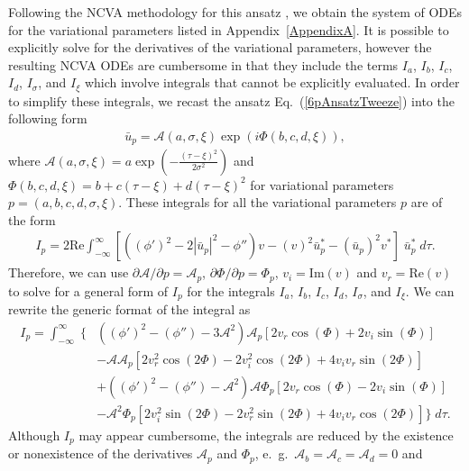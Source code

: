 Following the NCVA methodology for this ansatz , we obtain the system of ODEs for the variational parameters listed in Appendix~\ref{AppendixA}.  It is possible to explicitly solve for the derivatives of the variational parameters, however the resulting NCVA ODEs are cumbersome in that they include the terms $I_a$, $I_b$, $I_c$, $I_d$, $I_{\sigma}$, and $I_{\xi}$ which involve integrals that cannot be explicitly evaluated.  In order to simplify these integrals, we recast the ansatz Eq.~(\ref{6pAnsatzTweeze}) into the following form
\begin{align}
\bar{u}_p = \mathcal{A}(a, \sigma, \xi) \exp(i \Phi (b, c, d, \xi)),
\end{align}
where $\mathcal{A}(a,\sigma, \xi) = a \exp (-\frac{(\tau-\xi)^2}{2\sigma^2})$  and $\Phi(b,c,d,\xi) = b+c(\tau - \xi) + d (\tau-\xi)^2$ for variational parameters $p = (a, b, c, d, \sigma, \xi)$. 
These integrals for all the variational parameters $p$ are of the form
\begin{align}
I_p = 2 \mathrm{Re} \int_{-\infty}^{\infty} \left[\left((\phi')^2  - 2 |\bar{u}_p|^2- \phi''\right) v -  (v)^2 \bar{u}_p^* - (\bar{u}_p)^2 v^* \right] \; \bar{u}_p^* \;  d\tau.
\end{align}
Therefore, we can use $ \partial \mathcal{A}/ \partial p = \mathcal{A}_p$, $\partial \Phi/ \partial p = \Phi_p$, $v_i = \mathrm{Im}(v)$ and $v_r = \mathrm{Re}(v)$ to solve for a general form of $I_{p}$ for the integrals $I_a$, $I_b$, $I_c$, $I_d$, $I_{\sigma}$, and $I_{\xi}$.  We can rewrite the generic format of the integral as 
\begin{align}
I_p =\int_{-\infty}^{\infty} \; \Bigg \{ & \left( (\phi')^2-(\phi'') - 3\mathcal{A}^2\right) \mathcal{A}_p \left[ 2 v_r \cos(\Phi) + 2 v_i \sin(\Phi) \right]  \nonumber \\
&- \mathcal{A}\mathcal{A}_p \left[2v_r^2 \cos(2\Phi) - 2 v_i^2\cos(2\Phi) + 4 v_i v_r \sin(2\Phi) \right]  \nonumber \\
&+ \left( (\phi')^2-(\phi'') - \mathcal{A}^2\right) \mathcal{A} \Phi_p \left[ 2 v_r \cos(\Phi) - 2 v_i \sin(\Phi) \right]  \nonumber \\
&- \mathcal{A}^2\Phi_p \left[2v_i^2 \sin(2\Phi) - 2 v_r^2\sin(2\Phi) + 4 v_i v_r \cos(2\Phi) \right] 
\Bigg \} \; d\tau.
\end{align}
Although $I_p$ may appear cumbersome, the integrals are reduced by the existence or nonexistence of the derivatives $\mathcal{A}_p$ and $\Phi_p$, e.~g.~$\mathcal{A}_b = \mathcal{A}_c = \mathcal{A}_d = 0$ and 
